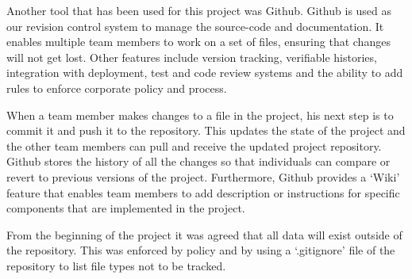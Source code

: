 Another tool that has been used for this project was Github. Github is used as our revision control system to manage 
the source-code and documentation. It enables multiple team members to work on a set of files, 
ensuring that changes will not get lost. Other features include version tracking, verifiable histories, integration with deployment, 
test and code review systems and the ability to add rules to enforce corporate policy and process.

When a team member makes changes to a file in the project, his next step is to commit it and push it to the repository. 
This updates the state of the project and the other team members can pull and receive the updated project repository. 
Github stores the history of all the changes so that individuals can compare or revert 
to previous versions of the project. Furthermore, Github provides a `Wiki' feature that enables team members 
to add description or instructions for specific components that are implemented in the project.

From the beginning of the project it was agreed that all data will exist outside of the repository. This was enforced by 
policy and by using a `.gitignore' file of the repository to list file types
not to be tracked.


